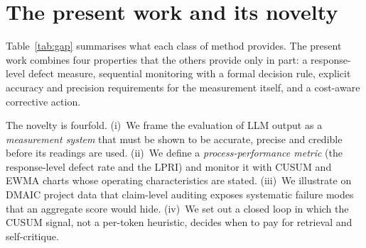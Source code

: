 \documentclass[11pt]{article}
\begin{document}
\section{The present work and its novelty}\label{sec:novelty}

Table~\ref{tab:gap} summarises what each class of method provides. The present work combines four properties that the others provide only in part: a response-level defect measure, sequential monitoring with a formal decision rule, explicit accuracy and precision requirements for the measurement itself, and a cost-aware corrective action.

\begin{table}[!htbp]
\centering\small
\caption{Properties of present evaluation approaches and of this work. \checkmark\ = provided; $\circ$ = partly; -- = not provided.}\label{tab:gap}
\end{table}

The novelty is fourfold. (i)~We frame the evaluation of LLM output as a \emph{measurement system} that must be shown to be accurate, precise and credible before its readings are used. (ii)~We define a \emph{process-performance metric} (the response-level defect rate and the LPRI) and monitor it with CUSUM and EWMA charts whose operating characteristics are stated. (iii)~We illustrate on DMAIC project data that claim-level auditing exposes systematic failure modes that an aggregate score would hide. (iv)~We set out a closed loop in which the CUSUM signal, not a per-token heuristic, decides when to pay for retrieval and self-critique.
\end{document}
